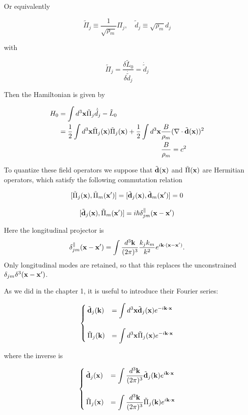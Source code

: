 Or equivalently

\[\tilde{\Pi}_j\equiv\frac{1}{\sqrt{\rho_m}}\Pi_j,\quad \tilde{d}_j\equiv\sqrt{\rho_m}d_j \]

with

\[\tilde{\Pi}_j = \frac{\delta \tilde L_0}{\delta\dot{\tilde{d}}_j} = \dot{\tilde{d}}_j \]

Then the Hamiltonian is given by

\[\begin{split}
H_0 &= \int d^3{\bf x}\tilde{\Pi}_j\dot{\tilde{d}}_j - \tilde{L}_0\\
 &=\frac{1}{2}\int d^3{\bf x}\tilde{\Pi}_j({\bf x})\tilde{\Pi}_j({\bf x}) + \frac{1}{2}\int d^3{\bf x}\frac{B}{\rho_m}(\nabla\cdot\tilde{\bf d}{\bf(x)})^2\\
 & \quad\quad\quad\quad\quad\quad\quad\quad\quad\quad\quad\quad\quad\quad\quad \frac{B}{\rho_m} = c^2
\end{split}\]

To quantize these field operators we suppose that $\tilde{\bf d}(\bf x)$ and $\tilde{\Pi}(\bf x)$ are Hermitian operators, which satisfy the following commutation relation

\[[\tilde{\Pi}_j({\bf x}),\tilde{\Pi}_m({\bf x'})] = [\tilde{\bf d}_j({\bf x}),\tilde{\bf d}_m({\bf x'})] = 0 \]

\[[\tilde{\bf d}_j({\bf x}), \tilde{\Pi}_m({\bf x'})] = i\hbar\delta^{\parallel}_{jm}({\bf x-x'}) \]

Here the longitudinal projector is
\[\delta^{\parallel}_{jm}({\bf x-x'})=\int\frac{d^3{\bf k}}{(2\pi)^3}\frac{k_jk_m}{k^2}e^{i{\bf k}\cdot({\bf x-x'})}.\]
Only longitudinal modes are retained, so that this replaces the unconstrained $\delta_{jm}\delta^3({\bf x-x'})$.

As we did in the chapter 1, it is useful to introduce their Fourier series:

\[\begin{cases}
\tilde{\bf d}_j({\bf k}) &= \displaystyle\int d^3{\bf x}\tilde{\bf d}_j({\bf x}) e^{-i\bf k\cdot x}\\
\ & \\
\tilde{\Pi}_j({\bf k}) &= \displaystyle\int d^3 {\bf x} \tilde{\Pi}_j({\bf x}) e^{-i\bf k\cdot x}
\end{cases}\]

where the inverse is

\[\begin{cases}
\tilde{\bf d}_j({\bf x}) &= \displaystyle\int \frac{d^3{\bf k}}{(2\pi)^3}\tilde{\bf d}_j({\bf k}) e^{i\bf k\cdot x}\\
\ & \\
\tilde{\Pi}_j({\bf x}) &= \displaystyle\int \frac{d^3 {\bf k}}{(2\pi)^3} \tilde{\Pi}_j({\bf k}) e^{i\bf k\cdot x}
\end{cases}\]

